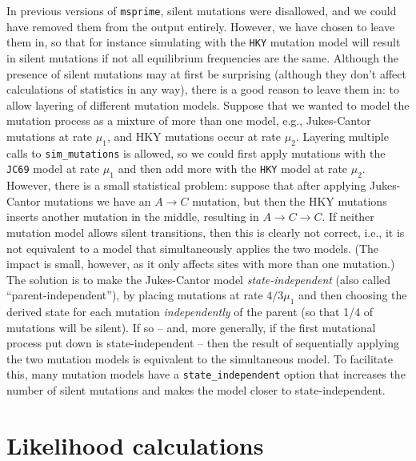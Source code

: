 \documentclass{article}
\newcommand{\msprime}[0]{\texttt{msprime}}
\begin{document}
In previous versions of \msprime, silent mutations were disallowed,
and we could have removed them from the output entirely.
However, we have chosen to leave them in, so that for instance
simulating with the \texttt{HKY} mutation model will result in silent mutations
if not all equilibrium frequencies are the same.
Although the presence of silent mutations may at first be surprising
(although they don't affect calculations of statistics in any way),
there is a good reason to leave them in:
to allow layering of different mutation models.
Suppose that we wanted to model the mutation process as a mixture of more than one model,
e.g., Jukes-Cantor mutations at rate $\mu_1$, and
HKY mutations occur at rate $\mu_2$.
Layering multiple calls to \texttt{sim\_mutations} is allowed,
so we could first apply mutations with the \texttt{JC69} model at rate $\mu_1$
and then add more with the \texttt{HKY} model at rate $\mu_2$.
However, there is a small statistical problem:
suppose that after applying Jukes-Cantor mutations we have an $A \to C$ mutation,
but then the HKY mutations inserts another mutation in the middle,
resulting in $A \to C \to C$.
If neither mutation model allows silent transitions,
then this is clearly not correct,
i.e., it is not equivalent to a model that simultaneously applies the two models.
(The impact is small, however, as it only affects sites with more than one mutation.)
The solution is to make the Jukes-Cantor model \emph{state-independent}
(also called ``parent-independent''),
by placing mutations at rate $4/3 \mu_1$ and then choosing the derived state for each mutation
\emph{independently} of the parent (so that 1/4 of mutations will be silent).
If so -- and, more generally, if the first mutational process put down is state-independent --
then the result of sequentially applying the two mutation models
is equivalent to the simultaneous model.
To facilitate this, many mutation models have a \texttt{state\_independent} option
that increases the number of silent mutations
and makes the model closer to state-independent.


\section*{Likelihood calculations}
\label{app-likelihoods}
\end{document}
